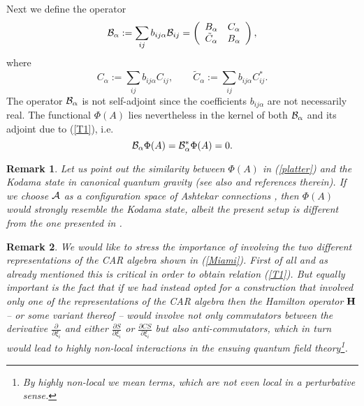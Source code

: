 \documentclass[letterpaper,11pt]{article}
\def\a{\alpha}
\def\ca{{\cal A}}
\def\cb{{\cal B}}
\def\ch{{\cal H}}
\newcommand{\pa}{\partial}
\newtheorem{remark}{Remark}
\begin{document}
Next we define the operator
\begin{eqnarray}
\cb_{\a}:= \sum_{ij} b_{ij\a} \cb_{ij} =   \left(
\begin{array}{cc}
 B_\a  & C_\a \\ 
\tilde{C}_\a    &  B_\a
\end{array}
\right),
\label{BDx22}
\end{eqnarray}
where
$$
C_\a := \sum_{ij} b_{ij\a} C_{ij} ,  \qquad     \tilde{C}_\a  := \sum_{ij} b_{ij\a} C_{ij}^*.
$$
The operator $\cb_\a$ is not self-adjoint since the coefficients $b_{ij\a}$ are not necessarily real. The functional $\Phi(A)$ lies nevertheless in the kernel of both $\cb_\a$ and its adjoint due to (\ref{T1}), i.e. 
$$
\cb_\a \Phi(A) = \cb^*_\a \Phi(A)  =0.
$$



\begin{remark}
Let us point out the similarity between $\Phi(A)$ in (\ref{platter}) and the Kodama state in canonical quantum gravity \cite{Kodama:1988yf} (see also \cite{Smolin:2002sz} and references therein). If we choose $\ca$ as a configuration space of Ashtekar connections \cite{Ashtekar:1986yd,Ashtekar:1987gu}, then $\Phi(A)$ would strongly resemble the Kodama state, albeit the present setup is different from the one presented in \cite{Smolin:2002sz}.
\end{remark}



\begin{remark}
We would like to stress the importance of involving the two different representations of the CAR algebra shown in (\ref{Miami}). First of all and as already mentioned this is critical in order to obtain relation (\ref{T1}). But equally important is the fact that if we had instead opted for a construction that involved only one of the representations of the CAR algebra then the Hamilton operator ${\bf H}$ -- or some variant thereof -- would involve not only commutators between the derivative $\frac{\pa}{\pa\xi_i}$ and either $\frac{\pa S}{\pa\xi_i}$ or $\frac{\pa CS}{\pa\xi_i}$ but also anti-commutators, which in turn would lead to highly non-local interactions in the ensuing quantum field theory\footnote{By highly non-local we mean terms, which are not even local in a perturbative sense.}. 
\end{remark}
\end{document}
